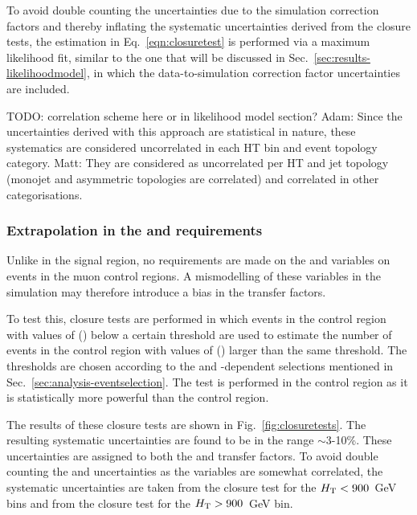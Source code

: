 To avoid double counting the uncertainties due to the simulation correction 
factors and thereby inflating the systematic uncertainties derived from the 
closure tests, the estimation in Eq.~\ref{eqn:closuretest} is performed via a 
maximum likelihood fit, similar to the one that will be discussed in 
Sec.~\ref{sec:results-likelihoodmodel}, in which the data-to-simulation 
correction factor uncertainties are included.

TODO: correlation scheme here or in likelihood model section?
Adam: Since
the uncertainties derived with this approach are statistical in nature, these 
systematics
are considered uncorrelated in each HT bin and event topology category.
Matt: They
are considered as uncorrelated per HT and jet topology (monojet and asymmetric
topologies are correlated) and correlated in other categorisations.

\subsubsection{Extrapolation in the \alphat and \bdphi requirements}
Unlike in the signal region, no requirements are made on the \alphat and \bdphi 
variables on events in the muon control regions. A mismodelling of these 
variables in the simulation may therefore introduce a bias in the transfer 
factors.

To test this, closure tests are performed in which events in the \mj control 
region with values of \alphat (\bdphi) below a certain threshold are used to 
estimate the number of events in the \mj control region with values of \alphat 
(\bdphi) larger than the same threshold. The thresholds are chosen according to 
the \bdphi and \scalht-dependent selections mentioned in 
Sec.~\ref{sec:analysis-eventselection}. The test is performed in the \mj 
control region as it is statistically more powerful than the \mmj control 
region.

The results of these closure tests are shown in Fig.~\ref{fig:closuretests}. 
The resulting systematic uncertainties are found to be in the range 
$\sim$3-10\%. These uncertainties are assigned to both the \Tmutottw and 
\Tmumutoz transfer factors. To avoid double counting the \alphat and \bdphi 
uncertainties as the variables are somewhat correlated, the systematic 
uncertainties are taken from the \alphat closure test for the $\mbox{$H_\text{T}$}<900$~GeV 
bins and from the \bdphi closure test for the $\mbox{$H_\text{T}$}>900$~GeV bin.


